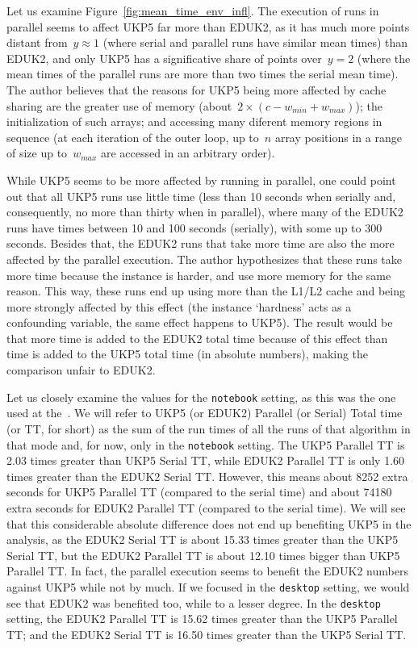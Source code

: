 Let us examine Figure~\ref{fig:mean_time_env_infl}.
The execution of runs in parallel seems to affect UKP5 far more than EDUK2, as it has much more points distant from~\(y \approx 1\) (where serial and parallel runs have similar mean times) than EDUK2, and only UKP5 has a significative share of points over~\(y = 2\) (where the mean times of the parallel runs are more than two times the serial mean time).
The author believes that the reasons for UKP5 being more affected by cache sharing are the greater use of memory (about~\(2 \times (c - w_{min} + w_{max})\)); the initialization of such arrays; and accessing many diferent memory regions in sequence (at each iteration of the outer loop, up to~\(n\) array positions in a range of size up to~\(w_{max}\) are accessed in an arbitrary order).

While UKP5 seems to be more affected by running in parallel, one could point out that all UKP5 runs use little time (less than 10 seconds when serially and, consequently, no more than thirty when in parallel), where many of the EDUK2 runs have times between 10 and 100 seconds (serially), with some up to 300 seconds.
Besides that, the EDUK2 runs that take more time are also the more affected by the parallel execution.
The author hypothesizes that these runs take more time because the instance is harder, and use more memory for the same reason.
This way, these runs end up using more than the L1/L2 cache and being more strongly affected by this effect (the instance `hardness' acts as a confounding variable, the same effect happens to UKP5).
The result would be that more time is added to the EDUK2 total time because of this effect than time is added to the UKP5 total time (in absolute numbers), making the comparison unfair to EDUK2.%

Let us closely examine the values for the \verb+notebook+ setting, as this was the one used at the~\cite{sea2016}.
We will refer to UKP5 (or EDUK2) Parallel (or Serial) Total time (or TT, for short) as the sum of the run times of all the runs of that algorithm in that mode and, for now, only in the \verb+notebook+ setting.
The UKP5 Parallel TT is 2.03 times greater than UKP5 Serial TT, while EDUK2 Parallel TT is only 1.60 times greater than the EDUK2 Serial TT.
However, this means about 8252 extra seconds for UKP5 Parallel TT (compared to the serial time) and about 74180 extra seconds for EDUK2 Parallel TT (compared to the serial time).
We will see that this considerable absolute difference does not end up benefiting UKP5 in the analysis, as the EDUK2 Serial TT is about 15.33 times greater than the UKP5 Serial TT, but the EDUK2 Parallel TT is about 12.10 times bigger than UKP5 Parallel TT.
In fact, the parallel execution seems to benefit the EDUK2 numbers against UKP5 while not by much.
If we focused in the \verb+desktop+ setting, we would see that EDUK2 was benefited too, while to a lesser degree.
In the \verb+desktop+ setting, the EDUK2 Parallel TT is 15.62 times greater than the UKP5 Parallel TT; and the EDUK2 Serial TT is 16.50 times greater than the UKP5 Serial TT.


